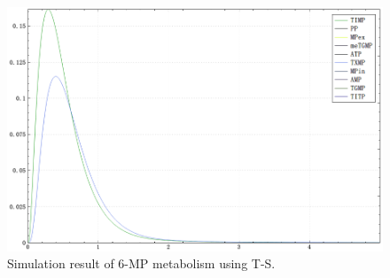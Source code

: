 \documentclass[journal,a4paper,onecolumn]{article}
\begin{document}
\begin{figure}[!hbt]
	\begin{center}
		\includegraphics[width=\columnwidth]{fig56}
		\caption{Simulation result of 6-MP metabolism using T-S.}
		\label{fig:Simulation result of 6-MP metabolism using T-S.}
	\end{center}
\end{figure}

\clearpage


 
\end{document}

